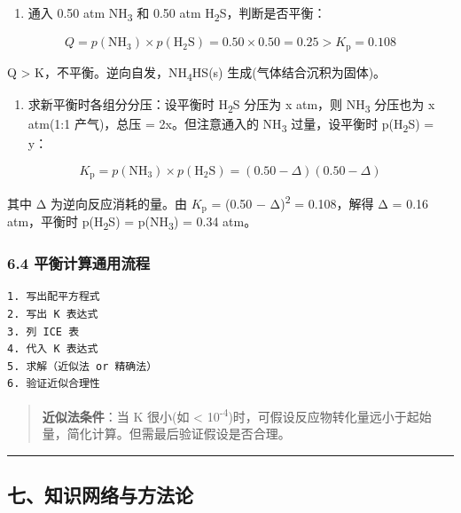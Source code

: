 \begin{enumerate}
\def\labelenumi{(\alph{enumi})}
\tightlist
\item
  通入 0.50 atm NH\textsubscript{3} 和 0.50 atm H\textsubscript{2}S，判断是否平衡：
\end{enumerate}

\[
Q = p(\mathrm{NH_3}) \times p(\mathrm{H_2S}) = 0.50 \times 0.50 = 0.25 > K_{\mathrm p} = 0.108
\]

Q \textgreater{} K，不平衡。逆向自发，NH\textsubscript{4}HS(s) 生成(气体结合沉积为固体)。

\begin{enumerate}
\def\labelenumi{(\alph{enumi})}
\setcounter{enumi}{1}
\tightlist
\item
  求新平衡时各组分分压：设平衡时 H\textsubscript{2}S 分压为 x atm，则 NH\textsubscript{3} 分压也为 x atm(1:1 产气)，总压 = 2x。但注意通入的 NH\textsubscript{3} 过量，设平衡时 p(H\textsubscript{2}S) = y：
\end{enumerate}

\[
K_{\mathrm p} = p(\mathrm{NH_3}) \times p(\mathrm{H_2S}) = (0.50 - \Delta)(0.50 - \Delta)
\]

其中 Δ 为逆向反应消耗的量。由 \(K_{\mathrm p}\) = (0.50 − Δ)\textsuperscript{2} = 0.108，解得 Δ = 0.16 atm，平衡时 p(H\textsubscript{2}S) = p(NH\textsubscript{3}) = 0.34 atm。

\subsubsection{6.4 平衡计算通用流程}\label{ux5e73ux8861ux8ba1ux7b97ux901aux7528ux6d41ux7a0b}

\begin{verbatim}
1. 写出配平方程式
2. 写出 K 表达式
3. 列 ICE 表
4. 代入 K 表达式
5. 求解（近似法 or 精确法）
6. 验证近似合理性
\end{verbatim}

\begin{quote}
\textbf{近似法条件}：当 K 很小(如 \textless{} 10\textsuperscript{-4})时，可假设反应物转化量远小于起始量，简化计算。但需最后验证假设是否合理。
\end{quote}

\begin{center}\rule{0.5\linewidth}{0.5pt}\end{center}

\subsection{七、知识网络与方法论}\label{ux4e03ux77e5ux8bc6ux7f51ux7edcux4e0eux65b9ux6cd5ux8bba}

